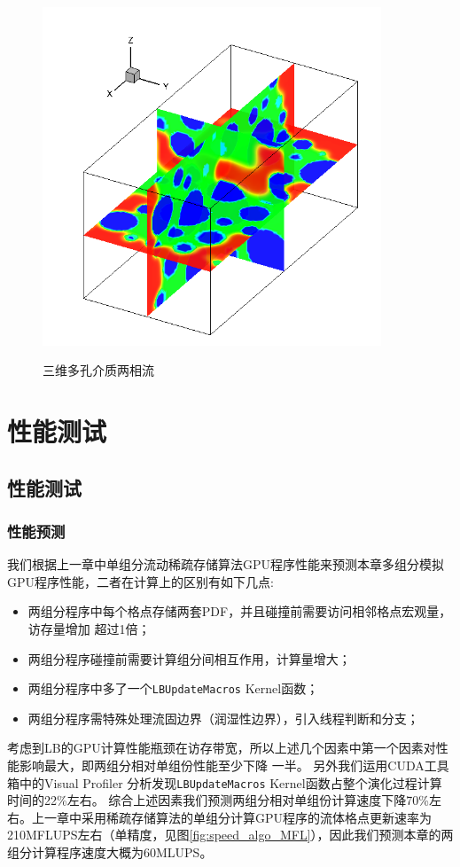 \begin{figure}[htpb]
{\begin{minipage}[b]{0.4\textwidth}
      \includegraphics[width = 0.9\textwidth]{img/3d_porous/2_phase}
      \label{fig:3d_porous_2_phase}
    \end{minipage}
  }
  \caption{三维多孔介质两相流}
\end{figure}


\section{性能测试}
\subsection{性能测试}
\subsubsection{性能预测}
我们根据上一章中单组分流动稀疏存储算法GPU程序性能来预测本章多组分模拟GPU程序性能，二者在计算上的区别有如下几点:
\begin{itemize}
  \item 两组分程序中每个格点存储两套PDF，并且碰撞前需要访问相邻格点宏观量，访存量增加
    超过1倍；
  \item 两组分程序碰撞前需要计算组分间相互作用，计算量增大；
  \item 两组分程序中多了一个\texttt{LBUpdateMacros} Kernel函数；
  \item 两组分程序需特殊处理流固边界（润湿性边界），引入线程判断和分支；
\end{itemize}
考虑到LB的GPU计算性能瓶颈在访存带宽，所以上述几个因素中第一个因素对性能影响最大，即两组分相对单组份性能至少下降
一半。
另外我们运用CUDA工具箱中的Visual Profiler 分析发现\texttt{LBUpdateMacros} Kernel函数占整个演化过程计算时间的22\%左右。
综合上述因素我们预测两组分相对单组份计算速度下降70\%左右。上一章中采用稀疏存储算法的单组分计算GPU程序的流体格点更新速率为
210MFLUPS左右（单精度，见图\ref{fig:speed_algo_MFL}），因此我们预测本章的两组分计算程序速度大概为60MLUPS。

